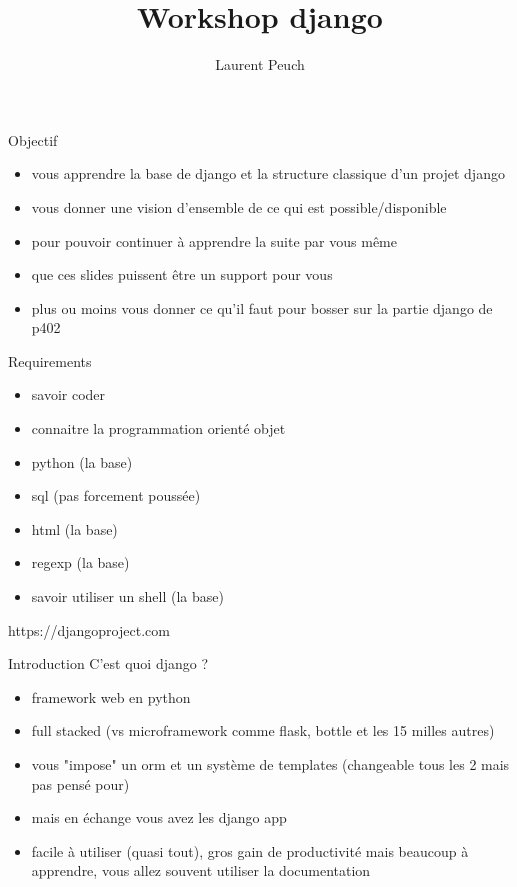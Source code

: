 \documentclass{beamer}
\begin{document}
\title{Workshop django}
\author{Laurent Peuch}

\maketitle{}

\begin{frame}{Objectif}
\begin{itemize}
    \item vous apprendre la base de django et la structure classique d'un projet django
    \item vous donner une vision d'ensemble de ce qui est possible/disponible
    \item pour pouvoir continuer à apprendre la suite par vous même
    \item que ces slides puissent être un support pour vous
    \item plus ou moins vous donner ce qu'il faut pour bosser sur la partie django de p402
\end{itemize}
\end{frame}

\begin{frame}{Requirements}
\begin{itemize}
    \item savoir coder
    \item connaitre la programmation orienté objet
    \item python (la base)
    \item sql (pas forcement poussée)
    \item html (la base)
    \item regexp (la base)
    \item savoir utiliser un shell (la base)
\end{itemize}
\end{frame}

\begin{frame}[fragile]{}
    \LARGE \begin{center}https://djangoproject.com\end{center}
\end{frame}

\begin{frame}{Introduction}
    \vspace{3mm}
    C'est quoi django ?
    \begin{itemize}
        \item framework web en python\pause
        \item full stacked (vs microframework comme flask, bottle et les 15 milles autres)\pause
        \item vous "impose" un orm et un système de templates (changeable tous les 2 mais pas pensé pour)\pause
        \item mais en échange vous avez les django app\pause
        \item facile à utiliser (quasi tout), gros gain de productivité mais beaucoup à apprendre, vous allez souvent utiliser la documentation
    \end{itemize}
\end{frame}
\end{document}
